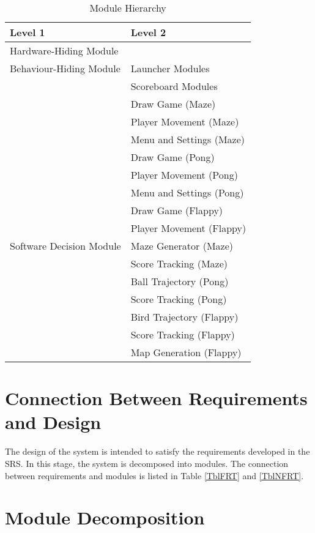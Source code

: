 \documentclass[12pt, titlepage]{article}
\begin{document}
\begin{table}[h!]
\centering
\begin{tabular}{p{} p{}}
\toprule
\textbf{Level 1} & \textbf{Level 2}\\
\midrule

{Hardware-Hiding Module} & ~ \\
\midrule

\multirow{1}{0.3\textwidth}{Behaviour-Hiding Module}
& Launcher Modules\\
& Scoreboard Modules\\
& Draw Game (Maze)\\
& Player Movement (Maze)\\
& Menu and Settings (Maze)\\ 
& Draw Game (Pong)\\
& Player Movement (Pong)\\
& Menu and Settings (Pong)\\ 
& Draw Game (Flappy)\\
& Player Movement (Flappy) \\

\midrule

  \multirow{1}{0.3\textwidth}{Software Decision Module}
& Maze Generator (Maze)\\
& Score Tracking (Maze)\\ 
& Ball Trajectory (Pong)\\
& Score Tracking (Pong) \\ 
& Bird Trajectory (Flappy)\\
& Score Tracking (Flappy)\\
& Map Generation (Flappy)\\
\bottomrule

\end{tabular}
\caption{Module Hierarchy}
\label{TblMH}
\end{table}

\section{Connection Between Requirements and Design} \label{SecConnection}

The design of the system is intended to satisfy the requirements developed in
the SRS. In this stage, the system is decomposed into modules. The connection
between requirements and modules is listed in Table \ref{TblFRT} and \ref{TblNFRT}.

\section{Module Decomposition} \label{SecMD}
\end{document}
